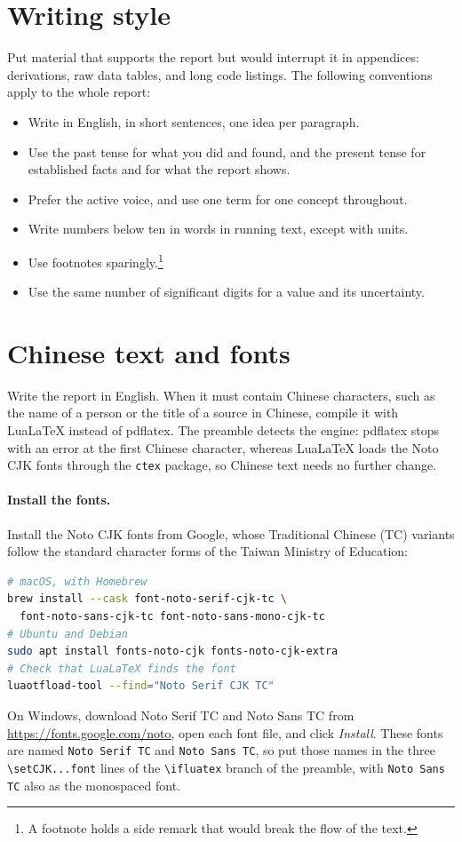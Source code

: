 \documentclass[10pt,a4paper,twocolumn]{article}
\begin{document}
\appendix
\section{Writing style}
\label{app:style}

Put material that supports the report but would interrupt it in appendices: derivations, raw data tables, and long code listings.
The following conventions apply to the whole report:
\begin{itemize}
  \item Write in English, in short sentences, one idea per paragraph.
  \item Use the past tense for what you did and found, and the present tense for established facts and for what the report shows.
  \item Prefer the active voice, and use one term for one concept throughout.
  \item Write numbers below ten in words in running text, except with units.
  \item Use footnotes sparingly.\footnote{A footnote holds a side remark that would break the flow of the text.}
  \item Use the same number of significant digits for a value and its uncertainty.
\end{itemize}

\section{Chinese text and fonts}
\label{app:chinese}

Write the report in English.
When it must contain Chinese characters, such as the name of a person or the title of a source in Chinese, compile it with LuaLaTeX instead of pdflatex.
The preamble detects the engine: pdflatex stops with an error at the first Chinese character, whereas LuaLaTeX loads the Noto CJK fonts through the \texttt{ctex} package, so Chinese text needs no further change.

\paragraph{Install the fonts.}
Install the Noto CJK fonts from Google, whose Traditional Chinese (TC) variants follow the standard character forms of the Taiwan Ministry of Education:
\begin{lstlisting}[language=bash]
# macOS, with Homebrew
brew install --cask font-noto-serif-cjk-tc \
  font-noto-sans-cjk-tc font-noto-sans-mono-cjk-tc
# Ubuntu and Debian
sudo apt install fonts-noto-cjk fonts-noto-cjk-extra
# Check that LuaLaTeX finds the font
luaotfload-tool --find="Noto Serif CJK TC"
\end{lstlisting}
On Windows, download Noto Serif TC and Noto Sans TC from \url{https://fonts.google.com/noto}, open each font file, and click \emph{Install}.
These fonts are named \texttt{Noto Serif TC} and \texttt{Noto Sans TC}, so put those names in the three \verb|\setCJK...font| lines of the \verb|\ifluatex| branch of the preamble, with \texttt{Noto Sans TC} also as the monospaced font.
\end{document}
